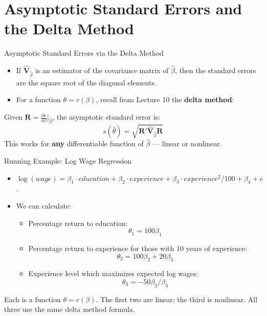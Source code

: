 \documentclass[aspectratio=169, handout, t]{beamer}
\numberwithin{equation}{section}
\begin{document}
\section{Asymptotic Standard Errors and the Delta Method}
\setcounter{subsection}{1}

\begin{frame}{Asymptotic Standard Errors via the Delta Method}
\begin{itemize}
\item If $\bm{\hat{V}}_{\hat{\beta}}$ is an estimator of the covariance matrix of $\hat{\beta}$, then the standard errors are the square root of the diagonal elements.
\item For a function $\theta = r(\beta)$, recall from Lecture 10 the \textbf{delta method}:
\end{itemize}

\pause

\begin{tcolorbox}
Given $\bm{R}=\frac{\partial r}{\partial\beta}\bigg|_{\hat\beta}$, the asymptotic standard error is:
$$s(\hat{\theta})=\sqrt{\bm{R}'\bm{\hat{V}}_{\hat{\beta}}\bm{R}}$$
This works for \textbf{any} differentiable function of $\hat\beta$ --- linear or nonlinear.
\end{tcolorbox}

\end{frame}


\begin{frame}{Running Example: Log Wage Regression}
\begin{itemize}
\item $\log(wage)=\beta_1 \cdot education+\beta_2 \cdot experience+\beta_3 \cdot experience^2/100+\beta_4+e$.
\item We can calculate:
\begin{itemize}
\item Percentage return to education:
$$\theta_1=100\beta_1$$
\item Percentage return to experience for those with 10 years of experience:
$$\theta_2=100\beta_2+20\beta_3$$
\item Experience level which maximizes expected log wages:
$$\theta_3=-50\beta_2/\beta_3$$
\end{itemize}
\end{itemize}

\pause

Each is a function $\theta = r(\beta)$. The first two are linear; the third is nonlinear. All three use the same delta method formula.

\end{frame}
\end{document}
